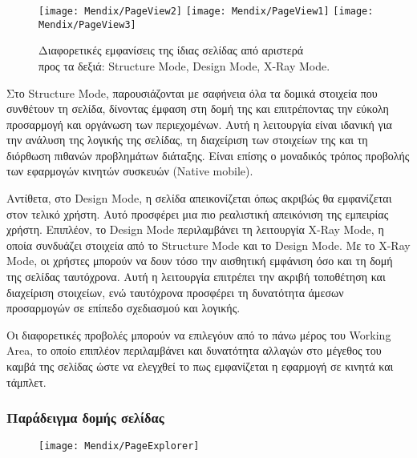             \begin{figure}[h!] \noindent \centering
                    \texttt{[image: Mendix/PageView2]}
                    \texttt{[image: Mendix/PageView1]}
                    \texttt{[image: Mendix/PageView3]}
                    \caption{\centering Διαφορετικές εμφανίσεις της ίδιας σελίδας από αριστερά \\ προς τα δεξιά: Structure Mode, Design Mode, X-Ray Mode.}
            \end{figure}

            Στο Structure Mode, παρουσιάζονται με σαφήνεια όλα τα δομικά στοιχεία που συνθέτουν τη σελίδα, δίνοντας έμφαση στη δομή της και επιτρέποντας την εύκολη προσαρμογή και οργάνωση των περιεχομένων. Αυτή η λειτουργία είναι ιδανική για την ανάλυση της λογικής της σελίδας, τη διαχείριση των στοιχείων της και τη διόρθωση πιθανών προβλημάτων διάταξης. Είναι επίσης ο μοναδικός τρόπος προβολής των εφαρμογών κινητών συσκευών (Native mobile).

            Αντίθετα, στο Design Mode, η σελίδα απεικονίζεται όπως ακριβώς θα εμφανίζεται στον τελικό χρήστη. Αυτό προσφέρει μια πιο ρεαλιστική απεικόνιση της εμπειρίας χρήστη. Επιπλέον, το Design Mode περιλαμβάνει τη λειτουργία X-Ray Mode, η οποία συνδυάζει στοιχεία από το Structure Mode και το Design Mode. Με το X-Ray Mode, οι χρήστες μπορούν να δουν τόσο την αισθητική εμφάνιση όσο και τη δομή της σελίδας ταυτόχρονα. Αυτή η λειτουργία επιτρέπει την ακριβή τοποθέτηση και διαχείριση στοιχείων, ενώ ταυτόχρονα προσφέρει τη δυνατότητα άμεσων προσαρμογών σε επίπεδο σχεδιασμού και λογικής.

            Οι διαφορετικές προβολές μπορούν να επιλεγόυν από το πάνω μέρος του Working Area, το οποίο επιπλέον περιλαμβάνει και δυνατότητα αλλαγών στο μέγεθος του καμβά της σελίδας ώστε να ελεγχθεί το πως εμφανίζεται η εφαρμογή σε κινητά και τάμπλετ.

        \subsubsection{Παράδειγμα δομής σελίδας}
            \begin{figure}[h!] \noindent \centering
                \texttt{[image: Mendix/PageExplorer]}
                \caption{\centering }
                \label{fig:MendixPageExplorer}
            \end{figure}

